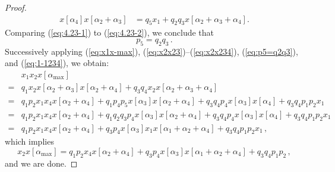 \documentclass[letterpaper]{amsart}
\numberwithin{equation}{section}
\theoremstyle{definition}
\begin{document}
\begin{proof}
\begin{align}
x[\alpha_4] x[\alpha_2\!+\!\alpha_3] 
&= q_5 x_1 + q_2 q_3 x[\alpha_2\!+\!\alpha_3\!+\!\alpha_4]. 
\end{align} 
Comparing (\ref{eq:4.23-1}) to (\ref{eq:4.23-2}), we conclude that 
\begin{equation} 
\label{eq:p5=q2q3} 
p_5=q_2 q_3\,. 
\end{equation} 
Successively applying (\ref{eq:x1x-max}), 
(\ref{eq:x2x23})--(\ref{eq:x2x234}), 
(\ref{eq:p5=q2q3}), and (\ref{eq:1-1234}), we obtain: 
\begin{align*} 
&x_1 x_2 x[\alpha_{\max}] 
\\[.05in] 
=&q_1 x_2 x[\alpha_2\!+\!\alpha_3]x[\alpha_2\!+\!\alpha_4] 
+q_3 q_4 x_2 x[\alpha_2\!+\!\alpha_3\!+\!\alpha_4] 
\\[.05in] 
=& q_1 p_2 x_1 x_4 x[\alpha_2\!+\!\alpha_4] 
+ q_1 p_4 p_5 x[\alpha_3]x[\alpha_2\!+\!\alpha_4] 
+q_3 q_4 p_4 x[\alpha_3]x[\alpha_4] 
+ q_3 q_4 p_1 p_2 x_1 
\\[.05in] 
=& q_1 p_2 x_1 x_4 x[\alpha_2\!+\!\alpha_4] 
+ q_1 q_2 q_3 p_4 x[\alpha_3]x[\alpha_2\!+\!\alpha_4] 
+q_3 q_4 p_4 x[\alpha_3]x[\alpha_4] 
+ q_3 q_4 p_1 p_2 x_1 
\\[.05in] 
=& q_1 p_2 x_1 x_4 x[\alpha_2\!+\!\alpha_4] 
+ q_3 p_4 x[\alpha_3] x_1 x[\alpha_1\!+\!\alpha_2\!+\!\alpha_4] 
+ q_3 q_4 p_1 p_2 x_1 \,, 
\end{align*} 
which implies 
\begin{equation} 
x_2 x[\alpha_{\max}] 
= q_1 p_2 x_4 x[\alpha_2\!+\!\alpha_4] 
+ q_3 p_4 x[\alpha_3] x[\alpha_1\!+\!\alpha_2\!+\!\alpha_4] 
+ q_3 q_4 p_1 p_2 \,, 
\end{equation} 
and we are done. 
\end{proof} 
 
 
\end{document}

